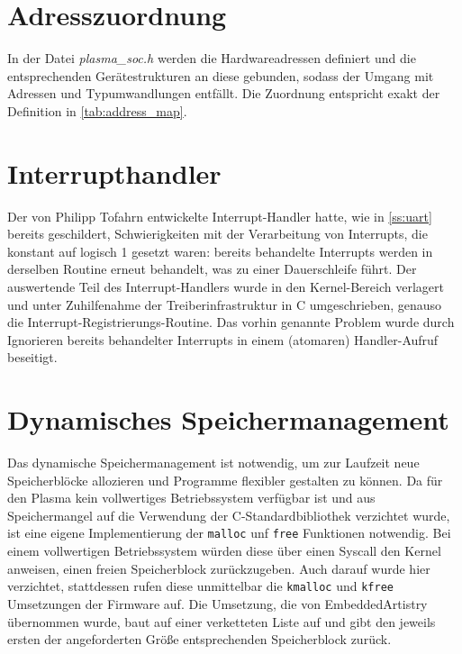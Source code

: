 \section{Adresszuordnung}

In der Datei \textit{plasma\_soc.h} werden die Hardwareadressen definiert und die entsprechenden Gerätestrukturen an diese gebunden, sodass der Umgang mit Adressen und Typumwandlungen entfällt. Die Zuordnung entspricht exakt der Definition in \cref{tab:address_map}.


\section{Interrupthandler}
\label{cha:irc_global_isr}
Der von Philipp Tofahrn entwickelte Interrupt-Handler hatte, wie in \cref{ss:uart} bereits geschildert, Schwierigkeiten mit der Verarbeitung von Interrupts, die konstant auf logisch 1 gesetzt waren: bereits behandelte Interrupts werden in derselben Routine erneut behandelt, was zu einer Dauerschleife führt. Der auswertende Teil des Interrupt-Handlers wurde in den Kernel-Bereich verlagert und unter Zuhilfenahme der Treiberinfrastruktur in C umgeschrieben, genauso die Interrupt-Registrierungs-Routine. Das vorhin genannte Problem wurde durch Ignorieren bereits behandelter Interrupts in einem (atomaren) Handler-Aufruf beseitigt.

\section{Dynamisches Speichermanagement}
\label{sec:memalloc}

Das dynamische Speichermanagement ist notwendig, um zur Laufzeit neue Speicherblöcke allozieren und Programme flexibler gestalten zu können. Da für den Plasma kein vollwertiges Betriebssystem verfügbar ist und aus Speichermangel auf die Verwendung der C-Standardbibliothek verzichtet wurde, ist eine eigene Implementierung der \texttt{malloc} unf \texttt{free} Funktionen notwendig. Bei einem vollwertigen Betriebssystem würden diese über einen Syscall den Kernel anweisen, einen freien Speicherblock zurückzugeben. Auch darauf wurde hier verzichtet, stattdessen rufen diese unmittelbar die \texttt{kmalloc} und \texttt{kfree} Umsetzungen der Firmware auf. Die Umsetzung, die von EmbeddedArtistry \cite{website:embedded_artistry_malloc} übernommen wurde, baut auf einer verketteten Liste auf und gibt den jeweils ersten der angeforderten Größe entsprechenden Speicherblock zurück. 

